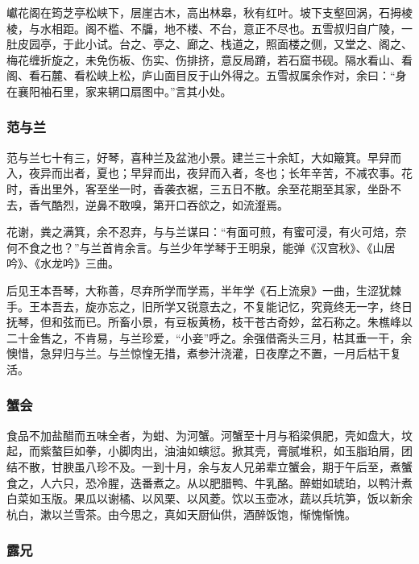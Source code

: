 \documentclass[]{article}
\begin{document}
巘花阁在筠芝亭松峡下，层崖古木，高出林皋，秋有红叶。坡下支壑回涡，石拇棱棱，与水相距。阁不槛、不牖，地不楼、不台，意正不尽也。五雪叔归自广陵，一肚皮园亭，于此小试。台之、亭之、廊之、栈道之，照面楼之侧，又堂之、阁之、梅花缠折旋之，未免伤板、伤实、伤排挤，意反局蹐，若石窟书砚。隔水看山、看阁、看石麓、看松峡上松，庐山面目反于山外得之。五雪叔属余作对，余曰：``身在襄阳袖石里，家来辋口扇图中。''言其小处。

\hypertarget{header-n631}{%
\subsubsection{范与兰}\label{header-n631}}

范与兰七十有三，好琴，喜种兰及盆池小景。建兰三十余缸，大如簸箕。早舁而入，夜异而出者，夏也；早舁而出，夜舁而入者，冬也；长年辛苦，不减农事。花时，香出里外，客至坐一时，香袭衣裾，三五日不散。余至花期至其家，坐卧不去，香气酷烈，逆鼻不敢嗅，第开口吞欱之，如流瀣焉。

花谢，粪之满箕，余不忍弃，与与兰谋曰：``有面可煎，有蜜可浸，有火可焙，奈何不食之也？''与兰首肯余言。与兰少年学琴于王明泉，能弹《汉宫秋》、《山居吟》、《水龙吟》三曲。

后见王本吾琴，大称善，尽弃所学而学焉，半年学《石上流泉》一曲，生涩犹棘手。王本吾去，旋亦忘之，旧所学又锐意去之，不复能记忆，究竟终无一字，终日抚琴，但和弦而已。所畜小景，有豆板黄杨，枝干苍古奇妙，盆石称之。朱樵峰以二十金售之，不肯易，与兰珍爱，``小妾''呼之。余强借斋头三月，枯其垂一干，余懊惜，急舁归与兰。与兰惊惶无措，煮参汁浇灌，日夜摩之不置，一月后枯干复活。

\hypertarget{header-n636}{%
\subsubsection{蟹会}\label{header-n636}}

食品不加盐醋而五味全者，为蚶、为河蟹。河蟹至十月与稻梁俱肥，壳如盘大，坟起，而紫螯巨如拳，小脚肉出，油油如螾愆。掀其壳，膏腻堆积，如玉脂珀屑，团结不散，甘腴虽八珍不及。一到十月，余与友人兄弟辈立蟹会，期于午后至，煮蟹食之，人六只，恐冷腥，迭番煮之。从以肥腊鸭、牛乳酪。醉蚶如琥珀，以鸭汁煮白菜如玉版。果瓜以谢橘、以风栗、以风菱。饮以玉壶冰，蔬以兵坑笋，饭以新余杭白，漱以兰雪茶。由今思之，真如天厨仙供，酒醉饭饱，惭愧惭愧。

\hypertarget{header-n641}{%
\subsubsection{露兄}\label{header-n641}}
\end{document}
